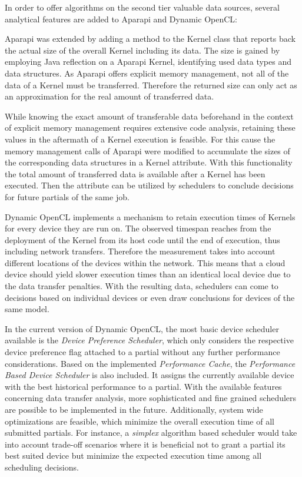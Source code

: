 In order to offer algorithms on the second tier valuable data sources, several analytical features are added to Aparapi and Dynamic OpenCL:
\begin{description}[style=nextline]
	\item[Kernel Data Size]
	Aparapi was extended by adding a method to the Kernel class that reports back the actual size of the overall Kernel including its data. The size is gained by employing Java reflection on a Aparapi Kernel, identifying used data types and data structures. As Aparapi offers explicit memory management, not all of the data of a Kernel must be transferred. Therefore the returned size can only act as an approximation for the real amount of transferred data.
	\item[Historical Data Transfer]
	While knowing the exact amount of transferable data beforehand in the context of explicit memory management requires extensive code analysis, retaining these values in the aftermath of a Kernel execution is feasible. For this cause the memory management calls of Aparapi were modified to accumulate the sizes of the corresponding data structures in a Kernel attribute. With this functionality the total amount of transferred data is available after a Kernel has been executed. Then the attribute can be utilized by schedulers to conclude decisions for future partials of the same job.
	\item[Performance Cache]
	Dynamic OpenCL implements a mechanism to retain execution times of Kernels for every device they are run on. The observed timespan reaches from the deployment of the Kernel from its host code until the end of execution, thus including network transfers. Therefore the measurement takes into account different locations of the devices within the network. This means that a cloud device should yield slower execution times than an identical local device due to the data transfer penalties. With the resulting data, schedulers can come to decisions based on individual devices or even draw conclusions for devices of the same model.
\end{description}

In the current version of Dynamic OpenCL, the most basic device scheduler available is the \textit{Device Preference Scheduler}, which only considers the respective device preference flag attached to a partial without any further performance considerations.
Based on the implemented \textit{Performance Cache}, the \textit{Performance Based Device Scheduler} is also included. It assigns the currently available device with the best historical performance to a partial. With the available features concerning data transfer analysis, more sophisticated and fine grained schedulers are possible to be implemented in the future. Additionally, system wide optimizations are feasible, which minimize the overall execution time of all submitted partials. For instance, a \textit{simplex} algorithm based scheduler would take into account trade-off scenarios where it is beneficial not to grant a partial its best suited device but minimize the expected execution time among all scheduling decisions.

